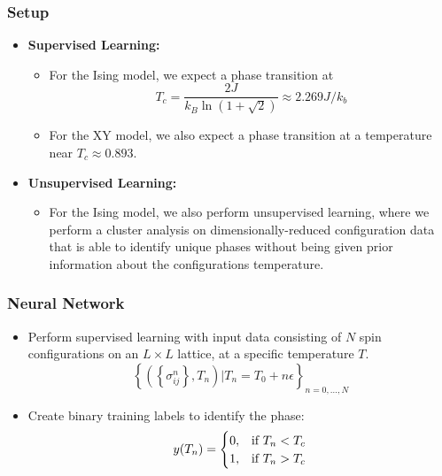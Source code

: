 \documentclass{beamer}
\begin{document}
\begin{frame}
	\frametitle{Setup}
	\begin{itemize}
		\item \textbf{Supervised Learning:}
			\begin{itemize}
			\item For the Ising model, we expect a phase transition at $$ T_c = \frac{2 J}{k_B \ln(1+\sqrt{2})} \approx 2.269 J/k_{b}$$
			\item For the XY model, we also expect a phase transition at a temperature near $T_c \approx 0.893$.
			\end{itemize}
		\item \textbf{Unsupervised Learning:}
			\begin{itemize}
				\item For the Ising model, we also perform unsupervised learning, where we perform a cluster analysis on dimensionally-reduced
					configuration data that is able to identify unique phases without being given prior information about the configurations temperature.
			\end{itemize}
	\end{itemize}
\end{frame}

\begin{frame}
\frametitle{Neural Network}
	\begin{itemize}
		\item Perform supervised learning with input data consisting of $N$ spin configurations on an $L \times L$ lattice, at a specific temperature $T$.
			\begin{equation}
				\left\{\left(\left\{\sigma_{ij}^{n}\right\}, T_n\right) \left| T_n = T_0 + n\epsilon \right. \right\}_{n = 0, \ldots, N}
			\end{equation}
		\item Create binary training labels to identify the phase:
		\begin{equation*}
			y(T_n)=
			\begin{cases}
				0,	&\text{if } T_n < T_{c}\cr
				1,	&\text{if } T_n > T_{c}
			\end{cases}
		\end{equation*}
	\end{itemize}
\end{frame}
\end{document}
